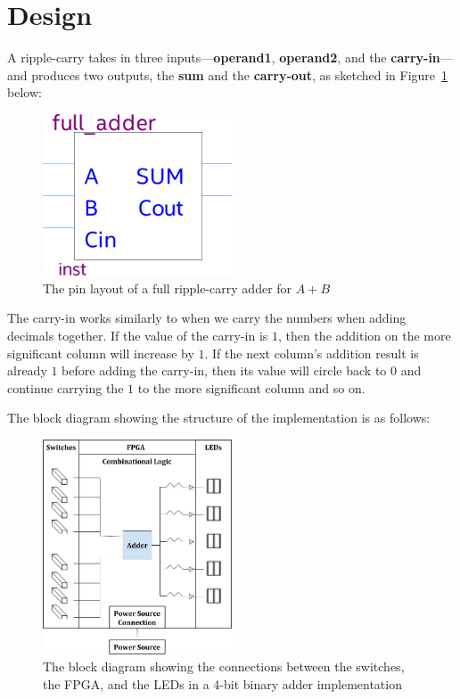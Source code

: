 \documentclass[12pt]{article}
\begin{document}
\section{Design}

A ripple-carry takes in three inputs---\textbf{operand1}, \textbf{operand2}, and the \textbf{carry-in}---and produces two outputs, the \textbf{sum} and the \textbf{carry-out}, as sketched in Figure~\ref{figure:1} below:

\begin{figure}[h]
  \centering
  \includegraphics[width=0.5\textwidth]{full_adder_layout.png}
  \caption{The pin layout of a full ripple-carry adder for $A + B$}
  \label{figure:1}
\end{figure}

The carry-in works similarly to when we carry the numbers when adding decimals together. If the value of the carry-in is $1$, then the addition on the more significant column will increase by $1$. If the next column's addition result is already $1$ before adding the carry-in, then its value will circle back to $0$ and continue carrying the $1$ to the more significant column and so on.

\newpage

The block diagram showing the structure of the implementation is as follows:

\begin{figure}[h]
  \centering
  \includegraphics[width=0.5\textwidth]{block_diagram.png}
  \caption{The block diagram showing the connections between the switches, the FPGA, and the LEDs in a 4-bit binary adder implementation}
\end{figure}
\end{document}
